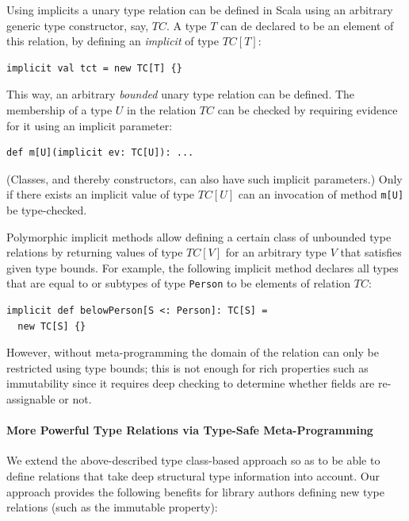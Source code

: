 \documentclass[preprint,nocopyrightspace]{sigplanconf}
\begin{document}
Using implicits a unary type relation can be defined in Scala using an arbitrary generic
type constructor, say, $TC$. A type $T$ can de declared to be an element of this
relation, by defining an {\em implicit} of type $TC[T]$:

\begin{lstlisting}
implicit val tct = new TC[T] {}
\end{lstlisting}
\noindent
This way, an arbitrary {\em bounded} unary type relation can be defined. The
membership of a type $U$ in the relation $TC$ can be checked by requiring evidence
for it using an implicit parameter:

\begin{lstlisting}
def m[U](implicit ev: TC[U]): ...
\end{lstlisting}
\noindent
(Classes, and thereby constructors, can also have such implicit parameters.)
Only if there exists an implicit value of type $TC[U]$ can an invocation
of method \verb|m[U]| be type-checked.

Polymorphic implicit methods allow defining a certain class of unbounded type
relations by returning values of type $TC[V]$ for an arbitrary type $V$ that satisfies
given type bounds. For example, the following implicit method declares all types that
are equal to or subtypes of type \verb|Person| to be elements of relation $TC$:

\begin{lstlisting}
implicit def belowPerson[S <: Person]: TC[S] =
  new TC[S] {}
\end{lstlisting}
\noindent
However, without meta-programming the domain of the relation can only be
restricted using type bounds; this is not enough for rich properties such as
immutability since it requires deep checking to determine whether fields are
re-assignable or not.

\paragraph{More Powerful Type Relations via Type-Safe Meta-Programming}

We extend the above-described type class-based approach so as to be able to
define relations that take deep structural type information into account. Our
approach provides the following benefits for library authors defining new type
relations (such as the immutable property):
\end{document}

